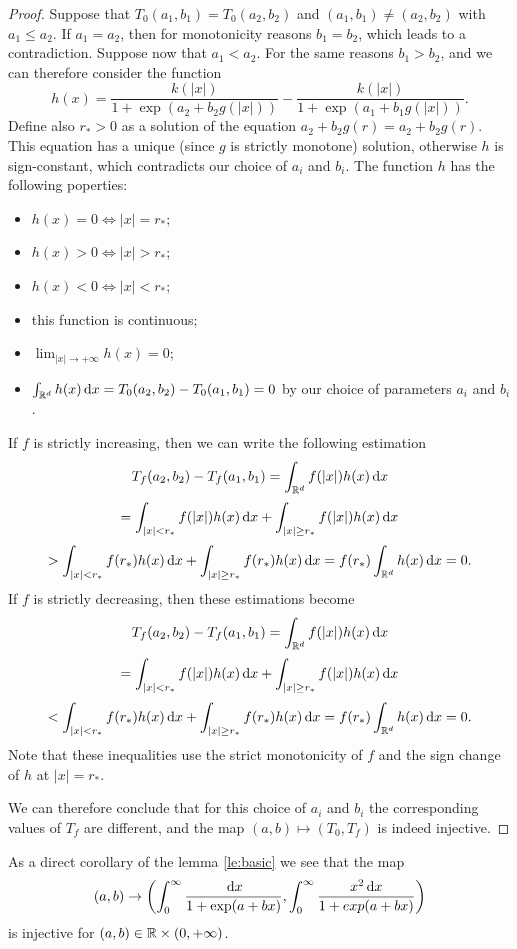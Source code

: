 \documentclass[a4paper]{article}
\begin{document}
\begin{proof}
	Suppose that $T_0(a_1,b_1)=T_0(a_2,b_2)$ and $(a_1,b_1)\ne (a_2,b_2)$ with $a_1\le a_2$.
	If $a_1=a_2$, then for monotonicity reasons $b_1=b_2$, which leads to a contradiction.
	Suppose now that $a_1<a_2$.
	For the same reasons $b_1>b_2$, and we can therefore consider the function
	\[
		h(x) = \frac{k(|x|)}{1+\exp(a_2+b_2g(|x|))}-\frac{k(|x|)}{1+\exp(a_1+b_1g(|x|))}.
	\]
	Define also $r_*>0$ as a solution of the equation $a_2+b_2g(r)=a_2+b_2g(r)$. This equation has a unique (since $g$ is strictly monotone) solution, otherwise $h$ is sign-constant, which  contradicts our choice of $a_i$ and $b_i$.
	The function $h$ has the following poperties:
	\begin{itemize}
	\item $h(x)=0\iff |x|=r_*$;
	\item $h(x)>0\iff |x|>r_*$;
	\item $h(x)<0\iff |x|<r_*$;
	\item this function is continuous;
	\item $\lim_{|x|\to +\infty}h(x)=0$;
	\item $\int_{{\mathbb R^d}}^{}h(x){\,\mathrm{d} x}=T_0(a_2,b_2)-T_0(a_1,b_1)=0$ by our choice of parameters $a_i$ and $b_i$.
	\end{itemize}
	If $f$ is strictly increasing, then we can write the following estimation %
	\[
	T_f(a_2,b_2)-T_f(a_1,b_1)=\int_{{\mathbb R^d}}^{}f(|x|)h(x){\,\mathrm{d} x}\]
	\[=\int_{|x|<r_*}^{}f(|x|)h(x){\,\mathrm{d} x}+\int_{|x|\ge r_*}^{}f(|x|)h(x){\,\mathrm{d} x}
	\]
	\[
		> \int_{|x|<r_*}^{}f(r_*)h(x){\,\mathrm{d} x}+\int_{|x|\ge r_*}^{}f(r_*)h(x){\,\mathrm{d} x}=f(r_*)\int_{{\mathbb R^d}}^{}h(x){\,\mathrm{d} x}=0.
	\]
	If $f$ is strictly decreasing, then these estimations become
	\[
	T_f(a_2,b_2)-T_f(a_1,b_1)=\int_{{\mathbb R^d}}^{}f(|x|)h(x){\,\mathrm{d} x}\]\[=\int_{|x|<r_*}^{}f(|x|)h(x){\,\mathrm{d} x}+\int_{|x|\ge r_*}^{}f(|x|)h(x){\,\mathrm{d} x}
	\]
	\[
		< \int_{|x|<r_*}^{}f(r_*)h(x){\,\mathrm{d} x}+\int_{|x|\ge r_*}^{}f(r_*)h(x){\,\mathrm{d} x}=f(r_*)\int_{{\mathbb R^d}}^{}h(x){\,\mathrm{d} x}=0.
	\]
	Note that these inequalities use the strict monotonicity of $f$ and the sign change of $h$ at $|x|=r_*$.

	We can therefore conclude that for this choice of $a_i$ and $b_i$ the corresponding values of $T_f$ are different, and the map $(a,b)\mapsto (T_0,T_f)$ is indeed injective.

\end{proof}

\begin{corollary}
As a direct corollary of the lemma \ref{le:basic} we see that the map 
\[(a, b) \to \left( \int_0^\infty \frac{{\,\mathrm{d} x}}{1+\exp(a+bx)}, \int_0^\infty \frac{x^2{\,\mathrm{d} x}}{1+exp(a+bx)}	\right)\]
is injective for $(a,b)\in {\mathbb {R}}\times (0,+\infty)$.
\end{corollary}
\end{document}
